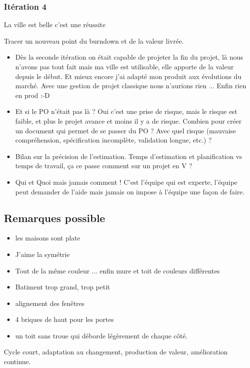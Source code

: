 \documentclass[a4paper,12pt]{article}
\begin{document}
\subsubsection{Itération 4}
La ville est belle c'est une réussite

Tracer un nouveau point du burndown et de la valeur livrée. 

\begin{itemize}
  \item Dès la seconde itération on était capable de projeter la fin du projet, là nous n'avons pas tout fait mais ma ville est utilisable, elle apporte de la valeur depuis le début. Et mieux encore j'ai adapté mon produit aux évolutions du marché. Avec une gestion de projet classique nous n'aurions rien ... Enfin rien en prod :-D 
  \item Et si le PO n'était pas là ? Oui c'est une prise de risque, mais le risque est faible, et plus le projet avance et moins il y a de risque. Combien pour créer un document qui permet de se passer du PO ? Avec quel risque (mauvaise compréhension, spécification incomplète, validation longue, etc.) ? 
  \item Bilan sur la précision de l'estimation. Temps d'estimation et planification vs temps de travail, ça ce passe comment sur un projet en V ?
  \item Qui et Quoi mais jamais comment ! C'est l'équipe qui est experte, l'équipe peut demander de l'aide mais jamais on impose à l'équipe une façon de faire.
\end{itemize}

\subsection{Remarques possible}
\begin{itemize}
  \item les maisons sont plate
  \item J'aime la symétrie
  \item Tout de la même couleur ... enfin mure et toit de couleurs différentes
  \item Batiment trop grand, trop petit
  \item alignement des fenêtres
  \item 4 briques de haut pour les portes
  \item un toit sans troue qui déborde légèrement de chaque côté.
\end{itemize}

Cycle court, adaptation au changement, production de valeur, amélioration continue.
\end{document}
